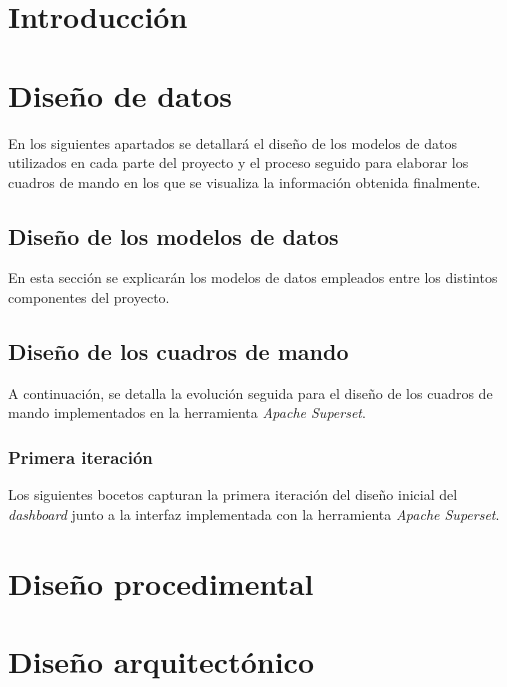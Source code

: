 
\section{Introducción}

\section{Diseño de datos}

En los siguientes apartados se detallará el diseño de los modelos de datos utilizados en cada parte del proyecto y el proceso seguido para elaborar los cuadros de mando en los que se visualiza la información obtenida finalmente.

\subsection{Diseño de los modelos de datos}

En esta sección se explicarán los modelos de datos empleados entre los distintos componentes del proyecto.

\subsection{Diseño de los cuadros de mando}

A continuación, se detalla la evolución seguida para el diseño de los cuadros de mando implementados en la herramienta \textit{Apache Superset}.

\subsubsection{Primera iteración}

Los siguientes bocetos capturan la primera iteración del diseño inicial del \textit{dashboard} junto a la interfaz implementada con la herramienta \textit{Apache Superset}.







\section{Diseño procedimental}

\section{Diseño arquitectónico}


